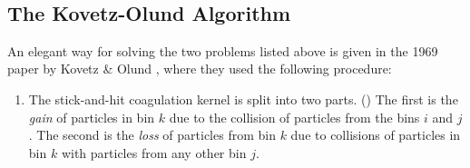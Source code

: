      \\


    \clearpage\subsection{The Kovetz-Olund Algorithm}
        
        An elegant way for solving the two problems listed above is given in the 1969 paper
        by Kovetz \& Olund \cite{kovetz_olund_1969}, where they used the following procedure:
        \begin{enumerate}
            \item The stick-and-hit coagulation kernel is split into two parts. 
                ()
                The first is the \textit{gain} of particles in bin $k$ due to the collision of 
                particles from the bins $i$ and $j$. The second is the \textit{loss} of particles 
                from bin $k$ due to collisions of particles in bin $k$ with particles from any 
                other bin $j$.
            

\end{enumerate}
